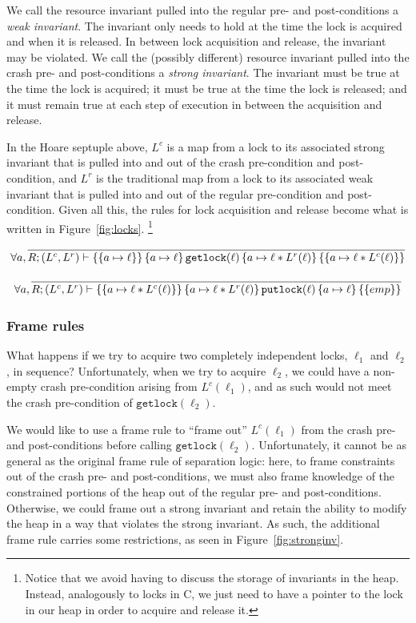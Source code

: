 We call the resource invariant pulled into the regular pre- and post-conditions
a \textit{weak invariant}.
The invariant only needs to hold at the time the lock
is acquired and when it is released.
In between lock acquisition and release,
the invariant may be violated.
We call the (possibly different) resource
invariant pulled into the crash pre- and post-conditions a \textit{strong
invariant}.
The invariant must be true at the time the lock is acquired; it must
be true at the time the lock is released; and it must remain true at each step
of execution in between the acquisition and release.

In the Hoare septuple above, $L^c$ is a map from a lock to its associated strong
invariant that is pulled into and out of the crash pre-condition and
post-condition, and $L^r$ is the traditional map from a lock to its associated
weak invariant that is pulled into and out of the regular pre-condition and
post-condition.
Given all this, the rules for lock acquisition and release
become what is written in Figure~\ref{fig:locks}.
\footnote{Notice that we avoid
having to discuss the storage of invariants in the heap.
Instead, analogously
to locks in C, we just need to have a pointer to the lock in our heap in order
to acquire and release it.}

\begin{figure*}
\begin{gather*}
    \forall a, \infer{\hoarestmt{R}{(L^c,L^r)}{a \mapsto \ell}{a \mapsto \ell}{\texttt{getlock}(\ell)}{a \mapsto \ell *
    L^r(\ell)}{a \mapsto \ell * L^c(\ell)}}{} \\[+9px]
    \forall a, \infer{\hoarestmt{R}{(L^c,L^r)}{a \mapsto \ell * L^c(\ell)}{a \mapsto \ell *
    L^r(\ell)}{\texttt{putlock}(\ell)}{a \mapsto \ell}{emp}}{}
\end{gather*}
\caption{Rules for getlock and putlock}
\label{fig:locks}
\end{figure*}

\subsubsection{Frame rules}

What happens if we try to acquire two completely independent locks, $\ell_1$ and
$\ell_2$, in sequence? Unfortunately, when we try to acquire $\ell_2$, we could
have a non-empty crash pre-condition arising from $L^c(\ell_1)$, and as such
would not meet the crash pre-condition of $\texttt{getlock}(\ell_2)$.

We would like to use a frame rule to ``frame out'' $L^c(\ell_1)$ from the crash
pre- and post-conditions before calling $\texttt{getlock}(\ell_2)$.
Unfortunately, it cannot be as general as the original frame rule of separation
logic: here, to frame constraints out of the crash pre- and post-conditions, we
must also frame knowledge of the constrained portions of the heap out of the
regular pre- and post-conditions.
Otherwise, we could frame out a strong
invariant and retain the ability to modify the heap in a way that violates the
strong invariant.
As such, the additional frame rule carries some restrictions,
as seen in Figure~\ref{fig:stronginv}.

